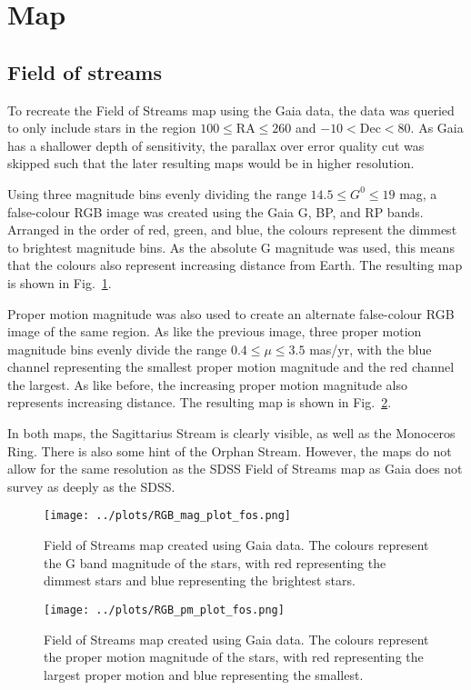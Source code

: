 \documentclass[11pt,a4paper]{article}
\begin{document}
\clearpage
\section{Map}
\subsection{Field of streams}
\label{sec:fieldstreams}
To recreate the Field of Streams map using the Gaia data, the data was queried to only include stars in the region $100 \le \mathrm{RA} \le 260$ and $-10 < \mathrm{Dec} < 80$. As Gaia has a shallower depth of sensitivity, the parallax over error quality cut was skipped such that the later resulting maps would be in higher resolution.

Using three magnitude bins evenly dividing the range $14.5 \le G^0 \le 19$ mag, a false-colour RGB image was created using the Gaia G, BP, and RP bands. Arranged in the order of red, green, and blue, the colours represent the dimmest to brightest magnitude bins. As the absolute G magnitude was used, this means that the colours also represent increasing distance from Earth. The resulting map is shown in Fig.~\ref{fig:fieldstreams}. 

Proper motion magnitude was also used to create an alternate false-colour RGB image of the same region. As like the previous image, three proper motion magnitude bins evenly divide the range $0.4 \le \mu \le 3.5$ mas/yr, with the blue channel representing the smallest proper motion magnitude and the red channel the largest. As like before, the increasing proper motion magnitude also represents increasing distance. The resulting map is shown in Fig.~\ref{fig:fieldstreams_pm}.

In both maps, the Sagittarius Stream is clearly visible, as well as the Monoceros Ring. There is also some hint of the Orphan Stream. However, the maps do not allow for the same resolution as the SDSS Field of Streams map as Gaia does not survey as deeply as the SDSS.

\begin{figure}
    \centering
    \texttt{[image: ../plots/RGB\_mag\_plot\_fos.png]}
    \caption{Field of Streams map created using Gaia data. The colours represent the G band magnitude of the stars, with red representing the dimmest stars and blue representing the brightest stars.}
    \label{fig:fieldstreams}
\end{figure}

\begin{figure}
    \centering
    \texttt{[image: ../plots/RGB\_pm\_plot\_fos.png]}
    \caption{Field of Streams map created using Gaia data. The colours represent the proper motion magnitude of the stars, with red representing the largest proper motion and blue representing the smallest.}
    \label{fig:fieldstreams_pm}
\end{figure}
\end{document}

